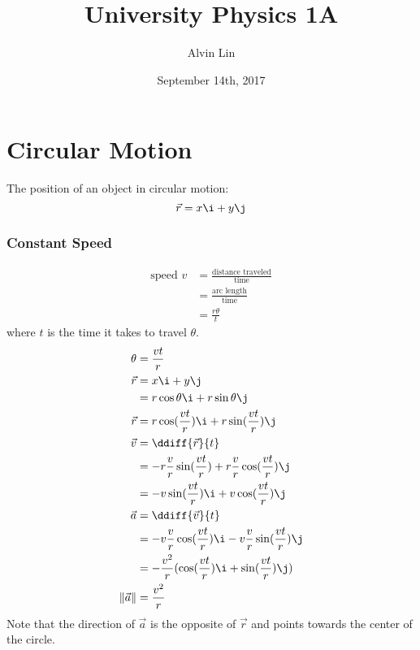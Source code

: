 \documentclass[letterpaper, 12pt]{math}
\title{University Physics 1A}
\author{Alvin Lin}
\date{September 14th, 2017}
\begin{document}
\maketitle

\section*{Circular Motion}
\begin{center}
\end{center}
The position of an object in circular motion:
\[ \vec{r} = x\i+y\j \]

\subsubsection*{Constant Speed}
\begin{align*}
  \text{speed } v &= \frac{\text{distance traveled}}{\text{time}} \\
  &= \frac{\text{arc length}}{\text{time}} \\
  &= \frac{r\theta}{t}
\end{align*}
where \( t \) is the time it takes to travel \( \theta \).
\begin{align*}
  \theta &= \frac{vt}{r} \\
  \vec{r} &= x\i+y\j \\
  &= r\cos\theta\i+r\sin\theta\j \\
  \vec{r} &= r\cos(\frac{vt}{r})\i+r\sin(\frac{vt}{r})\j \\
  \vec{v} &= \ddiff{\vec{r}}{t} \\
  &= -r\frac{v}{r}\sin(\frac{vt}{r})+r\frac{v}{r}\cos(\frac{vt}{r})\j \\
  &= -v\sin(\frac{vt}{r})\i+v\cos(\frac{vt}{r})\j \\
  \vec{a} &= \ddiff{\vec{v}}{t} \\
  &= -v\frac{v}{r}\cos(\frac{vt}{r})\i-v\frac{v}{r}\sin(\frac{vt}{r})\j \\
  &= -\frac{v^2}{r}(\cos(\frac{vt}{r})\i+\sin(\frac{vt}{r})\j) \\
  \|\vec{a}\| &= \frac{v^2}{r} \\
\end{align*}
Note that the direction of \( \vec{a} \) is the opposite of \( \vec{r} \) and
points towards the center of the circle.
\end{document}
